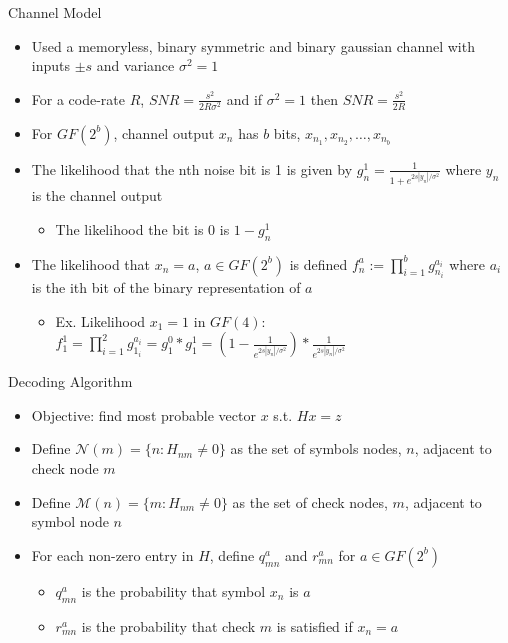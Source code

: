\documentclass[10pt,ignorenonframetext,]{beamer}
\providecommand{\tightlist}{%
  \setlength{\itemsep}{0pt}\setlength{\parskip}{0pt}}
\begin{document}
\begin{frame}{Channel Model}
\protect\hypertarget{channel-model}{}
\begin{itemize}[<+->]
\tightlist
\item
  Used a memoryless, binary symmetric and binary gaussian channel with
  inputs \(\pm s\) and variance \(\sigma^2=1\)
\item
  For a code-rate \(R\), \(SNR=\frac{s^2}{2R\sigma^2}\) and if
  \(\sigma^2=1\) then \(SNR=\frac{s^2}{2R}\)
\item
  For \(GF(2^b)\), channel output \(x_n\) has \(b\) bits,
  \(x_{n_1},x_{n_2},\dots,x_{n_b}\)
\item
  The likelihood that the nth noise bit is 1 is given by
  \(g_n^1=\frac{1}{1+e^{2s|y_n|/\sigma^2}}\) where \(y_n\) is the
  channel output

  \begin{itemize}[<+->]
  \tightlist
  \item
    The likelihood the bit is 0 is \(1-g_n^1\)
  \end{itemize}
\item
  The likelihood that \(x_n=a\), \(a\in GF(2^b)\) is defined
  \(f^a_n:=\prod_{i=1}^b g^{a_i}_{n_i}\) where \(a_i\) is the ith bit of
  the binary representation of \(a\)

  \begin{itemize}[<+->]
  \tightlist
  \item
    Ex. Likelihood \(x_1=1\) in \(GF(4)\):
    \(f^1_1 = \prod_{i=1}^2 g^{a_i}_{1_i} = g^{0}_{1} * g^1_1 = (1-\frac{1}{e^{2s|y_n|/\sigma^2}}) * \frac{1}{e^{2s|y_n|/\sigma^2}}\)
  \end{itemize}
\end{itemize}
\end{frame}

\begin{frame}{Decoding Algorithm}
\protect\hypertarget{decoding-algorithm}{}
\begin{itemize}[<+->]
\tightlist
\item
  Objective: find most probable vector \(x\) s.t. \(Hx=z\)
\item
  Define \(\mathcal{N}(m) = \{n:H_{nm}\neq 0\}\) as the set of symbols
  nodes, \(n\), adjacent to check node \(m\)
\item
  Define \(\mathcal{M}(n) = \{m:H_{nm}\neq 0\}\) as the set of check
  nodes, \(m\), adjacent to symbol node \(n\)
\item
  For each non-zero entry in \(H\), define \(q_{mn}^a\) and \(r_{mn}^a\)
  for \(a\in GF(2^b)\)

  \begin{itemize}[<+->]
  \tightlist
  \item
    \(q_{mn}^a\) is the probability that symbol \(x_n\) is \(a\)
  \item
    \(r_{mn}^a\) is the probability that check \(m\) is satisfied if
    \(x_n=a\)
  \end{itemize}
\end{itemize}
\end{frame}
\end{document}
